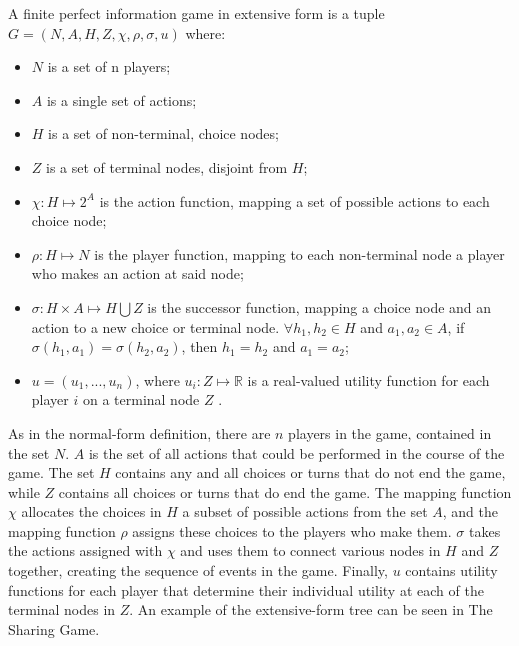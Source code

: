 \begin{define}
  A finite perfect information game in extensive form is a tuple $G = (N, A, H, Z, \chi, \rho, \sigma, u)$ where:
  \begin{itemize}
  \item $N$ is a set of n players;
  \item $A$ is a single set of actions;
  \item $H$ is a set of non-terminal, choice nodes;
  \item $Z$ is a set of terminal nodes, disjoint from $H$;
  \item $\chi: H\mapsto 2^A$ is the action function, mapping a set of possible actions to each choice node;
  \item $\rho: H\mapsto N$ is the player function, mapping to each non-terminal node a player who makes an action at said node;
  \item $\sigma: H\times A\mapsto H\bigcup Z$ is the successor function, mapping a choice node and an action to a new choice or terminal node. $\forall h_1, h_2\in H$ and $a_1, a_2\in A$, if $\sigma(h_1, a_1)=\sigma(h_2, a_2)$, then $h_1=h_2$ and $a_1=a_2$;
  \item $u=(u_1,...,u_n)$, where $u_i:Z\mapsto \mathbb{R}$ is a real-valued utility function for each player $i$ on a terminal node $Z$ \cite{shoh09}.
  \end{itemize}
\end{define}

As in the normal-form definition, there are $n$ players in the game, contained in the set $N$. $A$ is the set of all actions that could be performed in the course of the game. The set $H$ contains any and all choices or turns that do not end the game, while $Z$ contains all choices or turns that do end the game. The mapping function $\chi$ allocates the choices in $H$ a subset of possible actions from the set $A$, and the mapping function $\rho$ assigns these choices to the players who make them. $\sigma$ takes the actions assigned with $\chi$ and uses them to connect various nodes in $H$ and $Z$ together, creating the sequence of events in the game. Finally, $u$ contains utility functions for each player that determine their individual utility at each of the terminal nodes in $Z$. An example of the extensive-form tree can be seen in The Sharing Game.\\

